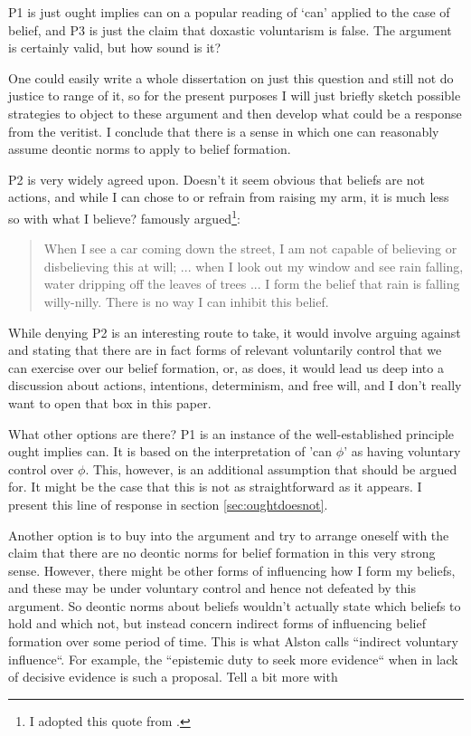 \documentclass[12pt,numbers=noenddot]{scrartcl}
\begin{document}
P1 is just ought implies can on a popular reading of ‘can’ applied to the case of belief, and P3 is just the claim that doxastic voluntarism is false. The argument is certainly valid, but how sound is it?

One could easily write a whole dissertation on just this question and still not do justice to range of it, so for the present purposes I will just briefly sketch possible strategies to object to these argument and then develop what could be a response from the veritist. I conclude that there is a sense in which one can reasonably assume deontic norms to apply to belief formation.

P2 is very widely agreed upon. Doesn't it seem obvious that beliefs are not actions, and while I can chose to or refrain from raising my arm, it is much less so with what I believe? \textcite[91]{Alston1989} famously argued\footnote{I adopted this quote from \textcite{Steup2000-STEDVA}.}:

\begin{quote}
    When I see a car coming down the street, I am not capable of believing or disbelieving this at will; ... when I look out my window and see rain falling, water dripping off the leaves of trees ... I form the belief that rain is falling willy-nilly. There is no way I can inhibit this belief.
\end{quote}

While denying P2 is an interesting route to take, it would involve arguing against \textcite{Alston1988-ALSTDC} and stating that there are in fact forms of relevant voluntarily control that we can exercise over our belief formation, or, as \textcite{Steup2000-STEDVA} does, it would lead us deep into a discussion about actions, intentions, determinism, and free will, and I don't really want to open that box in this paper. 

What other options are there? P1 is an instance of the well-established principle ought implies can. It is based on the interpretation of 'can $\phi$' as having voluntary control over $\phi$. This, however, is an additional assumption that should be argued for. It might be the case that this is not as straightforward as it appears. I present this line of response in section \ref{sec:oughtdoesnot}.

Another option is to buy into the argument and try to arrange oneself with the claim that there are no deontic norms for belief formation in this very strong sense. However, there might be other forms of influencing how I form my beliefs, and these may be under voluntary control and hence not defeated by this argument. So deontic norms about beliefs wouldn't actually state which beliefs to hold and which not, but instead concern indirect forms of influencing belief formation over some period of time. This is what Alston calls “indirect voluntary influence“. For example, the “epistemic duty to seek more evidence“ \textcite{Hall1998-HALTED-2} when in lack of decisive evidence is such a proposal. Tell a bit more with \textcite{Peels2014-PEEADC}
\end{document}
